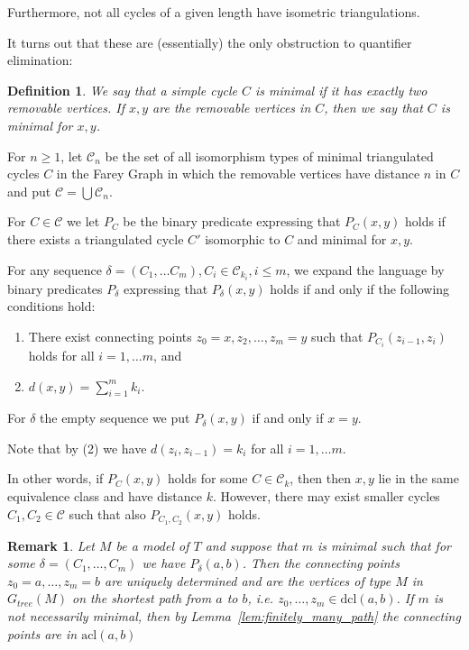 \documentclass[10pt,a4paper]{amsart}
\renewcommand{\d}{\delta}
\newcommand{\C}{\mathcal{C}}
\newcommand{\acl}{\mathrm{acl}}
\newcommand{\dcl}{\mathrm{dcl}}
\newtheorem{definition}[defi]{Definition}
\newtheorem{remark}[defi]{Remark}
\begin{document}
Furthermore, not all cycles of a given length have isometric triangulations.

It turns out that these are (essentially) the only obstruction to quantifier elimination:






\begin{definition}\label{def:min cycle} We say that a simple cycle $C$ is minimal if it has exactly two removable vertices. If $x,y$ are the removable vertices in $C$, then we say that $C$ is minimal for $x,y$.
\end{definition}




For $n\geq 1$, let $\C_n$ be the set of all  isomorphism types of minimal triangulated cycles $C$ in the Farey
Graph in which the removable vertices have distance $n$ in $C$ and
put $\C=\bigcup\C_n$.


For $C\in\C$ we let $P_C$ be the binary predicate expressing that $P_C(x, y)$ holds
if there exists a  triangulated cycle $C'$  isomorphic to $C$ and minimal for $x,y$.


For any sequence $\delta = (C_1, \dots C_m), C_i\in\C_{k_i}, i\leq m$,
we expand the language by binary predicates $P_\delta$ expressing that $P_\delta(x,y)$ holds if and only
if the following conditions hold:

\begin{enumerate}
    \item There exist connecting points $z_0=x,z_2, \dots, z_m=y$  such that
     $ P_{C_i}(z_{i-1}, z_i)$ holds for all $i=1,\ldots m$, and
    \item $d(x,y)=\sum_{i=1}^m k_i$.
\end{enumerate}

For $\delta$ the empty sequence we put $P_\d(x,y)$ if and only if $x=y$.

Note that by (2) we have $d(z_i,z_{i-1})=k_i$  for all $i=1,\ldots m$.

In other words, if $P_C(x,y)$ holds for some $C\in\C_k$, then  then $x,y$ lie in the same equivalence class and have distance $k$. However, there may exist smaller cycles $C_1,C_2\in \C$ such that also $P_{C_1,C_2}(x,y)$  holds. 

\begin{remark}\label{rem:unique connecting points}
Let $M$ be a model of $T$ and suppose that $m$ is minimal such that for some $\delta=(C_1,\ldots, C_m)$ we have $P_\d(a,b)$. Then the connecting points $z_0=a,\ldots, z_m=b$ are uniquely determined and are the vertices of type $M$ in $G_{tree}(M)$ on the shortest path from $a$  to $b$, i.e. $z_0,\ldots, z_m\in\dcl(a,b)$.
If $m$ is not necessarily minimal, then by Lemma~\ref{lem:finitely_many_path} the connecting points are in $\acl(a,b)$
\end{remark}
\end{document}
